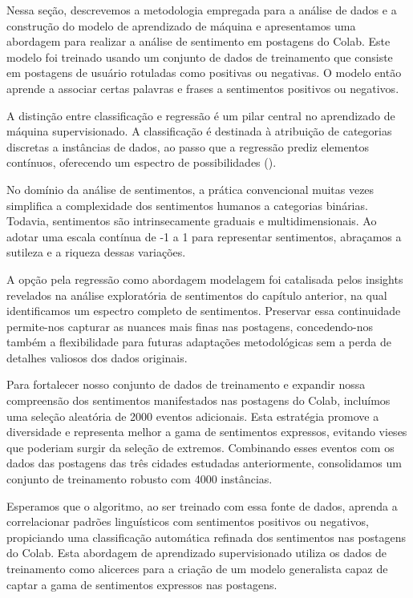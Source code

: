 Nessa seção, descrevemos a metodologia empregada para a análise de dados e a construção do modelo de aprendizado de máquina e apresentamos uma abordagem para realizar a análise de sentimento em postagens do Colab. Este modelo foi treinado usando um conjunto de dados de treinamento que consiste em postagens de usuário rotuladas como positivas ou negativas. O modelo então aprende a associar certas palavras e frases a sentimentos positivos ou negativos.

A distinção entre classificação e regressão é um pilar central no aprendizado de máquina supervisionado. A classificação é destinada à atribuição de categorias discretas a instâncias de dados, ao passo que a regressão prediz elementos contínuos, oferecendo um espectro de possibilidades ().

No domínio da análise de sentimentos, a prática convencional muitas vezes simplifica a complexidade dos sentimentos humanos a categorias binárias. Todavia, sentimentos são intrinsecamente graduais e multidimensionais. Ao adotar uma escala contínua de -1 a 1 para representar sentimentos, abraçamos a sutileza e a riqueza dessas variações.

A opção pela regressão como abordagem modelagem foi catalisada pelos insights revelados na análise exploratória de sentimentos do capítulo anterior, na qual identificamos um espectro completo de sentimentos. Preservar essa continuidade permite-nos capturar as nuances mais finas nas postagens, concedendo-nos também a flexibilidade para futuras adaptações metodológicas sem a perda de detalhes valiosos dos dados originais.

Para fortalecer nosso conjunto de dados de treinamento e expandir nossa compreensão dos sentimentos manifestados nas postagens do Colab, incluímos uma seleção aleatória de 2000 eventos adicionais. Esta estratégia promove a diversidade e representa melhor a gama de sentimentos expressos, evitando vieses que poderiam surgir da seleção de extremos. Combinando esses eventos com os dados das postagens das três cidades estudadas anteriormente, consolidamos um conjunto de treinamento robusto com 4000 instâncias.

Esperamos que o algoritmo, ao ser treinado com essa fonte de dados, aprenda a correlacionar padrões linguísticos com sentimentos positivos ou negativos, propiciando uma classificação automática refinada dos sentimentos nas postagens do Colab. Esta abordagem de aprendizado supervisionado utiliza os dados de treinamento como alicerces para a criação de um modelo generalista capaz de captar a gama de sentimentos expressos nas postagens.

